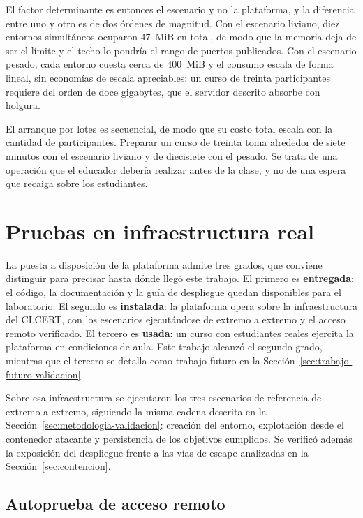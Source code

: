 El factor determinante es entonces el escenario y no la plataforma, y la
diferencia entre uno y otro es de dos órdenes de magnitud. Con el escenario
liviano, diez entornos simultáneos ocuparon 47~MiB en total, de modo que la
memoria deja de ser el límite y el techo lo pondría el rango de puertos
publicados. Con el escenario pesado, cada entorno cuesta cerca de 400~MiB y el
consumo escala de forma lineal, sin economías de escala apreciables: un curso de
treinta participantes requiere del orden de doce gigabytes, que el servidor
descrito absorbe con holgura.

El arranque por lotes es secuencial, de modo que su costo total escala con la
cantidad de participantes. Preparar un curso de treinta toma alrededor de siete
minutos con el escenario liviano y de diecisiete con el pesado. Se trata de una operación 
que el educador debería realizar antes de la clase, y no de
una espera que recaiga sobre los estudiantes.

\section{Pruebas en infraestructura real}
\label{sec:infra-real}

La puesta a disposición de la plataforma admite tres grados, que conviene
distinguir para precisar hasta dónde llegó este trabajo. El primero es
\textbf{entregada}: el código, la documentación y la guía de despliegue quedan
disponibles para el laboratorio. El segundo es \textbf{instalada}: la
plataforma opera sobre la infraestructura del CLCERT, con los escenarios
ejecutándose de extremo a extremo y el acceso remoto verificado. El tercero es
\textbf{usada}: un curso con estudiantes reales ejercita la plataforma en
condiciones de aula. Este trabajo alcanzó el segundo grado, mientras que el tercero se
detalla como trabajo futuro en la Sección~\ref{sec:trabajo-futuro-validacion}.

Sobre esa infraestructura se ejecutaron los tres escenarios de referencia de
extremo a extremo, siguiendo la misma cadena descrita en la
Sección~\ref{sec:metodologia-validacion}: creación del entorno, explotación
desde el contenedor atacante y persistencia de los objetivos cumplidos. Se
verificó además la exposición del despliegue frente a las vías de escape
analizadas en la Sección~\ref{sec:contencion}.

\subsection{Autoprueba de acceso remoto}

